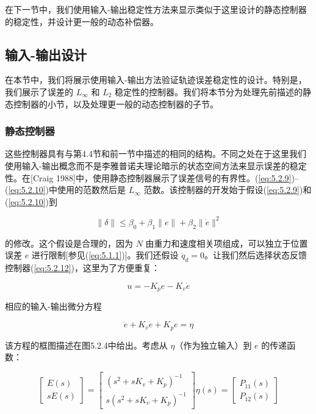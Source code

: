 \documentclass[UTF8,12pt,a4paper]{ctexart}
\begin{document}
在下一节中，我们使用输入-输出稳定性方法来显示类似于这里设计的静态控制器的稳定性，并设计更一般的动态补偿器。

\subsection{输入-输出设计}

在本节中，我们将展示使用输入-输出方法验证轨迹误差稳定性的设计。特别是，我们展示了误差的 $L_\infty$ 和 $L_2$ 稳定性的控制器。我们将本节分为处理先前描述的静态控制器的小节，以及处理更一般的动态控制器的子节。

\subsubsection{静态控制器}

这些控制器具有与第4.4节和前一节中描述的相同的结构。不同之处在于这里我们使用输入-输出概念而不是李雅普诺夫理论暗示的状态空间方法来显示误差的稳定性。在[Craig 1988]中，使用静态控制器展示了误差信号的有界性。(\ref{eq:5.2.9})--(\ref{eq:5.2.10})中使用的范数然后是 $L_\infty$ 范数。该控制器的开发始于假设(\ref{eq:5.2.9})和(\ref{eq:5.2.10})到

\begin{equation}\label{eq:5.2.20}
\|\delta\| \leq \beta_0 + \beta_1\|e\| + \beta_2\|\dot{e}\|^2
\end{equation}

的修改。这个假设是合理的，因为 $N$ 由重力和速度相关项组成，可以独立于位置误差 $e$ 进行限制[参见(\ref{eq:5.1.1})]。我们还假设 $\ddot{q}_d = 0$。让我们然后选择状态反馈控制器(\ref{eq:5.2.12})，这里为了方便重复：

\begin{equation}\label{eq:5.2.21}
u = -K_p e - K_v \dot{e}
\end{equation}

相应的输入-输出微分方程

\begin{equation}\label{eq:5.2.22}
\ddot{e} + K_v \dot{e} + K_p e = \eta
\end{equation}

该方程的框图描述在图5.2.4中给出。考虑从 $\eta$（作为独立输入）到 $e$ 的传递函数：

\begin{equation}\label{eq:5.2.23}
\begin{bmatrix} E(s) \\ sE(s) \end{bmatrix} = \begin{bmatrix} (s^2 + sK_v + K_p)^{-1} \\ s(s^2 + sK_v + K_p)^{-1} \end{bmatrix} \eta(s) = \begin{bmatrix} P_{11}(s) \\ P_{12}(s) \end{bmatrix}
\end{equation}
\end{document}

